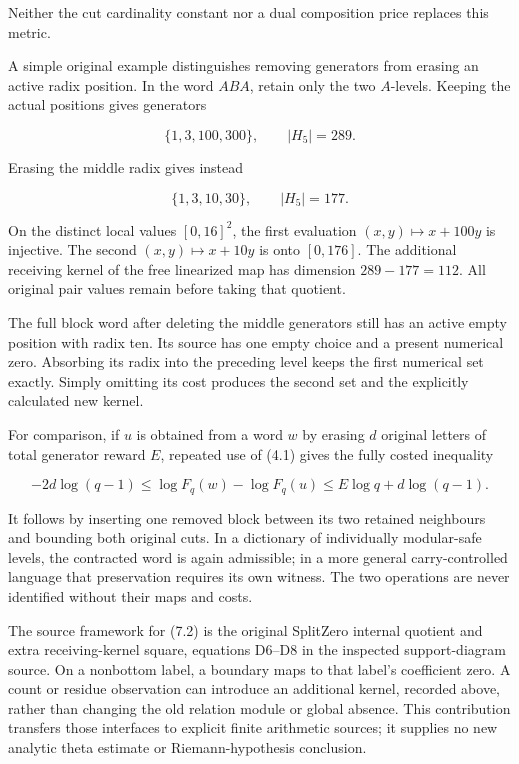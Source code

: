 Neither the cut cardinality constant nor a dual composition price replaces this metric.

A simple original example distinguishes removing generators from erasing an active radix position. In the word \(ABA\), retain only the two \(A\)-levels. Keeping the actual positions gives generators

\[
\{1,3,100,300\},\qquad |H_5|=289.
\]

Erasing the middle radix gives instead

\[
\{1,3,10,30\},\qquad |H_5|=177.
\]

On the distinct local values \([0,16]^2\), the first evaluation \((x,y)\mapsto x+100y\) is injective. The second \((x,y)\mapsto x+10y\) is onto \([0,176]\). The additional receiving kernel of the free linearized map has dimension \(289-177=112\). All original pair values remain before taking that quotient.

The full block word after deleting the middle generators still has an active empty position with radix ten. Its source has one empty choice and a present numerical zero. Absorbing its radix into the preceding level keeps the first numerical set exactly. Simply omitting its cost produces the second set and the explicitly calculated new kernel.

For comparison, if \(u\) is obtained from a word \(w\) by erasing \(d\) original letters of total generator reward \(E\), repeated use of (4.1) gives the fully costed inequality

\[
-2d\log(q-1)\le\log F_q(w)-\log F_q(u)
\le E\log q+d\log(q-1).
\tag{7.4}
\]

It follows by inserting one removed block between its two retained neighbours and bounding both original cuts. In a dictionary of individually modular-safe levels, the contracted word is again admissible; in a more general carry-controlled language that preservation requires its own witness. The two operations are never identified without their maps and costs.

The source framework for (7.2) is the original SplitZero internal quotient and extra receiving-kernel square, equations D6--D8 in the inspected support-diagram source. On a nonbottom label, a boundary maps to that label's coefficient zero. A count or residue observation can introduce an additional kernel, recorded above, rather than changing the old relation module or global absence. This contribution transfers those interfaces to explicit finite arithmetic sources; it supplies no new analytic theta estimate or Riemann-hypothesis conclusion.

